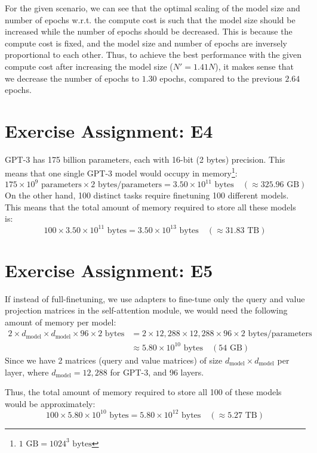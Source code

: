 \documentclass{article}
\begin{document}
For the given scenario, we can see that the optimal scaling of the model size and number of epochs w.r.t. the compute cost is such that the model size should be increased while the number of epochs should be decreased. This is because the compute cost is fixed, and the model size and number of epochs are inversely proportional to each other. Thus, to achieve the best performance with the given compute cost after increasing the model size ($N' = 1.41N$), it makes sense that we decrease the number of epochs to $1.30$ epochs, compared to the previous $2.64$ epochs.

\section{Exercise Assignment: E4}\label{sec:e4}
GPT-3 has 175 billion parameters, each with 16-bit (2 bytes) precision. This means that one single GPT-3 model would occupy in memory\footnote{$1 \text{ GB} = 1024^3 \text{ bytes}$}:
\[
    175 \times 10^9 \text{ parameters} \times 2 \text{ bytes}/\text{parameters} = 3.50 \times 10^{11} \text{ bytes} \quad (\approx 325.96 \text{ GB})
\]
On the other hand, 100 distinct tasks require finetuning 100 different models. This means that the total amount of memory required to store all these models is:
\[
    100 \times 3.50 \times 10^{11} \text{ bytes} = 3.50 \times 10^{13} \text{ bytes} \quad (\approx 31.83 \text{ TB})
\]

\section{Exercise Assignment: E5}\label{sec:e5}
If instead of full-finetuning, we use adapters to fine-tune only the query
and value projection matrices in the self-attention module, we would need the following amount of memory per model:
\begin{align*}
    2 \times d_{\text{model}} \times d_{\text{model}} \times 96 \times 2 \text{ bytes} & = 2 \times 12{,}288 \times 12{,}288 \times 96 \times 2 \text{ bytes}/\text{parameters} \\ &\approx 5.80 \times 10^{10} \text{ bytes} \quad (54 \text{ GB})
\end{align*}
Since we have 2 matrices (query and value matrices) of size $d_{\text{model}} \times d_{\text{model}}$ per layer, where $d_{\text{model}} = 12{,}288$ for GPT-3, and 96 layers.

Thus, the total amount of memory required to store all 100 of these models would be approximately:
\[
    100 \times 5.80 \times 10^{10} \text{ bytes} = 5.80 \times 10^{12} \text{ bytes} \quad (\approx 5.27 \text{ TB})
\]
\end{document}
